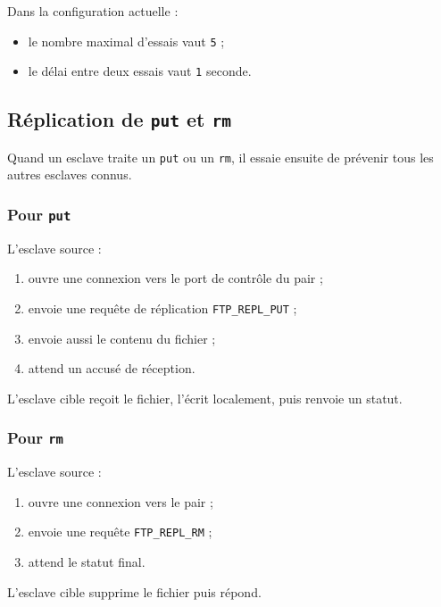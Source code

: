 \documentclass[a4paper,11pt]{article}
\begin{document}
Dans la configuration actuelle :

\begin{itemize}[leftmargin=*]
    \item le nombre maximal d'essais vaut \texttt{5} ;
    \item le délai entre deux essais vaut \texttt{1} seconde.
\end{itemize}

\subsection{Réplication de \texttt{put} et \texttt{rm}}

Quand un esclave traite un \texttt{put} ou un \texttt{rm}, il essaie ensuite de
prévenir tous les autres esclaves connus.

\subsubsection{Pour \texttt{put}}

L'esclave source :

\begin{enumerate}[leftmargin=*]
    \item ouvre une connexion vers le port de contrôle du pair ;
    \item envoie une requête de réplication \texttt{FTP\_REPL\_PUT} ;
    \item envoie aussi le contenu du fichier ;
    \item attend un accusé de réception.
\end{enumerate}

L'esclave cible reçoit le fichier, l'écrit localement, puis renvoie un statut.

\subsubsection{Pour \texttt{rm}}

L'esclave source :

\begin{enumerate}[leftmargin=*]
    \item ouvre une connexion vers le pair ;
    \item envoie une requête \texttt{FTP\_REPL\_RM} ;
    \item attend le statut final.
\end{enumerate}

L'esclave cible supprime le fichier puis répond.
\end{document}
